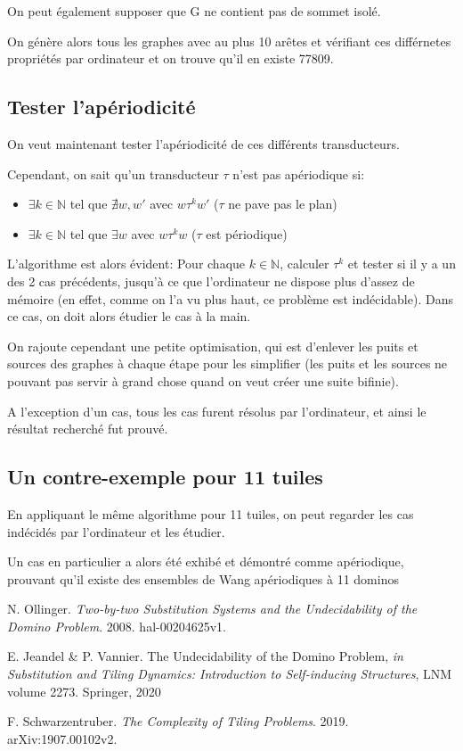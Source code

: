 \documentclass{scrartcl}
\newcommand{\N}{\mathbb N}
\theoremstyle{definition}
\theoremstyle{remark}
\begin{document}
On peut également supposer que G ne contient pas de sommet isolé.

On génère alors tous les graphes avec au plus 10 arêtes et vérifiant ces différnetes propriétés par ordinateur
et on trouve qu'il en existe 77809.

\subsection{Tester l'apériodicité}

On veut maintenant tester l'apériodicité de ces différents transducteurs.

Cependant, on sait qu'un transducteur $\tau$ n'est pas apériodique si:

\begin{itemize}
    \item $\exists k \in \N$ tel que $\nexists w,w'$ avec $w \tau^k w'$ ($\tau$ ne pave pas le plan)
    \item $\exists k \in \N$ tel que $\exists w$ avec $w \tau^k w$ ($\tau$ est périodique)
\end{itemize}

L'algorithme est alors évident: Pour chaque $k \in \N$, calculer $\tau^k$ et tester si il y a un des 2 cas précédents,
jusqu'à ce que l'ordinateur ne dispose plus d'assez de mémoire (en effet, comme on l'a vu plus haut, ce problème est indécidable).
Dans ce cas, on doit alors étudier le cas à la main.

On rajoute cependant une petite optimisation, qui est d'enlever les puits et sources des graphes à chaque étape pour les simplifier
(les puits et les sources ne pouvant pas servir à grand chose quand on veut créer une suite bifinie).

A l'exception d'un cas, tous les cas furent résolus par l'ordinateur, et ainsi le résultat recherché fut prouvé.

\subsection{Un contre-exemple pour 11 tuiles}
En appliquant le même algorithme pour 11 tuiles, on peut regarder les cas indécidés par l'ordinateur et les étudier.

Un cas en particulier a alors été exhibé et démontré comme apériodique, prouvant qu'il existe des ensembles de Wang
apériodiques à 11 dominos

\begin{thebibliography}{9}

   N. Ollinger. \emph{Two-by-two Substitution Systems and the Undecidability of the Domino Problem}. 2008. hal-00204625v1.
  
   E. Jeandel \& P. Vannier. The Undecidability of the Domino Problem, \emph{in} \emph{Substitution and Tiling Dynamics: Introduction to Self-inducing Structures}, LNM volume 2273. Springer, 2020

   F. Schwarzentruber. \emph{The Complexity of Tiling Problems}. 2019. arXiv:1907.00102v2.
\end{thebibliography}
\end{document}
